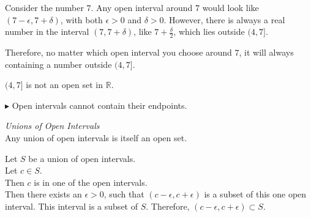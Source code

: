 \documentclass{ximera}
\begin{document}
\begin{example}
\begin{image}
  \end{image}






\begin{explanation}

Consider the number $7$.  Any open interval around $7$ would look like $(7 - \epsilon, 7 + \delta)$, with both $\epsilon > 0$  and $\delta > 0$.  However, there is always a real number in the interval $(7, 7 + \delta)$, like $7 + \frac{\delta}{2}$, which lies outside $(4, 7]$.

Therefore, no matter which open interval you choose around $7$, it will always containing a number outside $(4, 7]$.

$(4, 7]$  is not an open set in $\mathbb{R}$.

\end{explanation}
\end{example}

$\blacktriangleright$ Open intervals cannot contain their endpoints. \\





\begin{example}  \textit{Unions of Open Intervals} \\


Any union of open intervals is itself an open set.



\begin{explanation}

Let $S$ be a union of open intervals.  \\
Let $c \in S$. \\
Then $c$ is in one of the open intervals. \\
Then there exists an $\epsilon > 0$, such that $(c - \epsilon, c + \epsilon)$ is a subset of this one open interval.  This interval is a subset of $S$.  Therefore, $(c - \epsilon, c + \epsilon) \subset S$. \\


\end{explanation}

\end{example}
\end{document}
